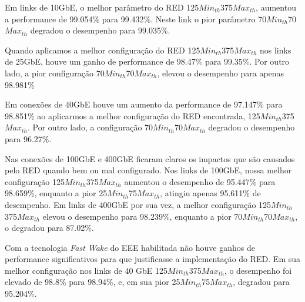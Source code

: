 Em links de 10GbE, o melhor parâmetro do RED 125{$\mathit{Min}_\mathit{th}$}375{$\mathit{Max}_\mathit{th}$}, aumentou a performance de 99.054\% para 99.432\%. Neste link o pior parâmetro 70{$\mathit{Min}_\mathit{th}$}70{$\mathit{Max}_\mathit{th}$} degradou o desempenho para 99.035\%.

Quando aplicamos a melhor configuração do RED 125{$\mathit{Min}_\mathit{th}$}375{$\mathit{Max}_\mathit{th}$} nos links de 25GbE, houve um ganho de performance de 98.47\% para 99.35\%. Por outro lado, a pior configuração 70{$\mathit{Min}_\mathit{th}$}70{$\mathit{Max}_\mathit{th}$}, elevou o desempenho para apenas 98.981\%

Em conexões de 40GbE houve um aumento da performance de 97.147\% para 98.851\% ao aplicarmos a melhor configuração do RED encontrada, 125{$\mathit{Min}_\mathit{th}$}375{$\mathit{Max}_\mathit{th}$}. Por outro lado, a configuração 70{$\mathit{Min}_\mathit{th}$}70{$\mathit{Max}_\mathit{th}$} degradou o desempenho para 96.27\%.

Nas conexões de 100GbE e 400GbE ficaram claros os impactos que são causados pelo RED quando bem ou mal configurado. Nos links de 100GbE, nossa melhor configuração 125{$\mathit{Min}_\mathit{th}$}375{$\mathit{Max}_\mathit{th}$} aumentou o desempenho de 95.447\% para 98.659\%, enquanto a pior 25{$\mathit{Min}_\mathit{th}$}75{$\mathit{Max}_\mathit{th}$}, atingiu apenas 95.611\% de desempenho. Em links de 400GbE por sua vez, a melhor configuração 125{$\mathit{Min}_\mathit{th}$}375{$\mathit{Max}_\mathit{th}$} elevou o desempenho para 98.239\%, enquanto a pior 70{$\mathit{Min}_\mathit{th}$}70{$\mathit{Max}_\mathit{th}$}, o degradou para 87.02\%.

Com a tecnologia \emph{Fast Wake} do EEE habilitada não houve ganhos de performance significativos para que justificasse a implementação do RED. Em sua melhor configuração nos links de 40 GbE 125{$\mathit{Min}_\mathit{th}$}375{$\mathit{Max}_\mathit{th}$}, o desempenho foi elevado de 98.8\% para 98.94\%, e, em sua pior 25{$\mathit{Min}_\mathit{th}$}75{$\mathit{Max}_\mathit{th}$}, degradou para 95.204\%.

